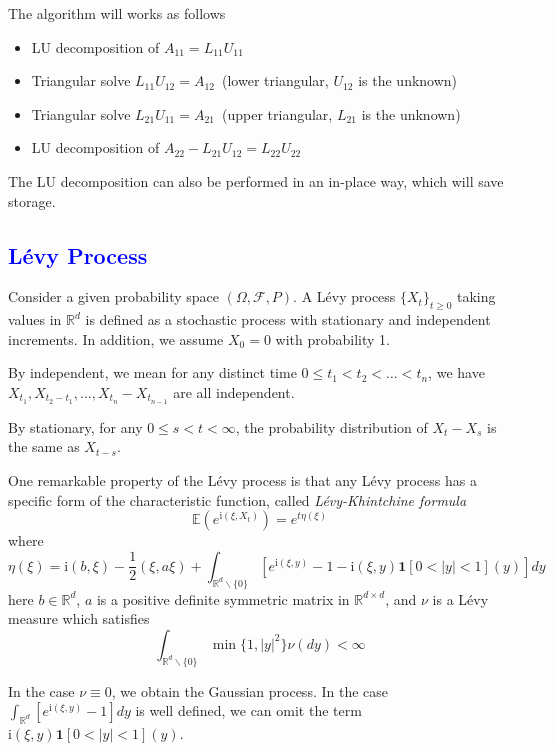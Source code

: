 \documentclass[10pt,a4paper]{article}
\newcommand{\ii}[0]{\mathrm{i}}
\newcommand{\RR}[0]{\mathbb{R}}
\newcommand{\lib}[1]{\subsection*{\textcolor{blue}{#1}}}
\theoremstyle{definition}
\begin{document}
The algorithm will works as follows
\begin{itemize}
	\item LU decomposition of $A_{11}=L_{11}U_{11}$
	\item Triangular solve $L_{11}U_{12}=A_{12}$~(lower triangular, $U_{12}$ is the unknown)
	\item Triangular solve $L_{21}U_{11} = A_{21}$~(upper triangular, $L_{21}$ is the unknown)
	\item LU decomposition of $A_{22}-L_{21}U_{12}=L_{22}U_{22}$
\end{itemize}	

The LU decomposition can also be performed in an in-place way, which will save storage. 
\lib{L\'evy Process}

Consider a given probability space $(\Omega, \mathcal{F}, P)$. A L\'evy process $\{X_t\}_{t\geq 0}$ taking values in $\RR^d$ is defined as a stochastic process with stationary and independent increments. In addition, we assume $X_0=0$ with probability 1. 

By independent, we mean for any distinct time $0\leq t_1<t_2<\ldots<t_n$, we have $X_{t_1}, X_{t_2-t_1}, \ldots, X_{t_n}-X_{t_{n-1}}$ are all independent. 

By stationary,  for any $0\leq s < t <\infty$, the probability distribution of $X_t-X_s$ is the same as $X_{t-s}$.

One remarkable property of the L\'evy process is that any L\'evy process has a specific form of the characteristic function, called \textit{L\'evy-Khintchine formula}
\begin{equation}
	\mathbb{E}(e^{\ii (\xi, X_t)}) = e^{t\eta(\xi)}
\end{equation}
where
\begin{equation}\label{equ:eta}
	\eta(\xi) = \ii (b, \xi) - \frac{1}{2}(\xi, a\xi) + \int_{\RR^d\backslash \{0\}} \left[ e^{\ii (\xi, y)}-1-\ii (\xi, y)\mathbf{1}[0<|y|<1](y) \right]dy
\end{equation}
here $b\in \RR^d$, $a$ is a positive definite symmetric matrix in $\RR^{d\times d}$, and $\nu$ is a L\'evy measure which satisfies
\begin{equation}
	\int_{\RR^d\backslash \{0\}} \min\{1, |y|^2\}\nu(dy)<\infty
\end{equation}

In the case $\nu\equiv 0$, we obtain the Gaussian process. In the case $\int_{\RR^d} \left[ e^{\ii (\xi, y)}-1\right]dy$ is well defined, we can omit the term $\ii (\xi, y)\mathbf{1}[0<|y|<1](y)$. 
\end{document}
